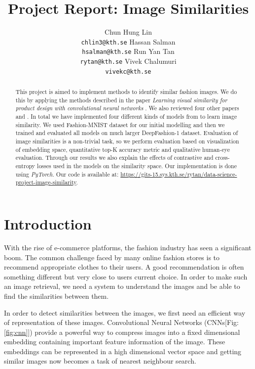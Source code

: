 \documentclass{article}
\title{Project Report: Image Similarities}
\author{
  Chun Hung Lin \\
  \texttt{chlin3@kth.se}
  \And
  Hassan Salman\\
  \texttt{hsalman@kth.se}
  \And
  Run Yan Tan \\
  \texttt{rytan@kth.se}
  \And
  Vivek Chalumuri \\
  \texttt{vivekc@kth.se}
}
\begin{document}

\maketitle

\begin{abstract}

This project is aimed to implement methods to identify similar fashion images. We do this by applying the methods described in the paper \textit{Learning visual similarity for product design with convolutional neural networks} \cite{bell2015learning}. We also reviewed four other papers \cite{wang2014learning} \cite{larsen2015autoencoding} \cite{yu2018novel} and \cite{dosovitskiy2016generating}. In total we have implemented four different kinds of models from \cite{bell2015learning} to learn image similarity. We used Fashion-MNIST \cite{xiao2017/online} dataset for our initial modelling and then we trained and evaluated all models on much larger DeepFashion-1 \cite{liuLQWTcvpr16DeepFashion} dataset. Evaluation of image similarities is a non-trivial task, so we perform evaluation based on visualization of embedding space, quantitative top-K accuracy metric and qualitative human-eye evaluation. Through our results we also explain the effects of contrastive and cross-entropy losses used in the models on the similarity space. Our implementation is done using \textit{PyTorch}. Our code is available at: \url{https://gits-15.sys.kth.se/rytan/data-science-project-image-similarity}.

\end{abstract}

\section{Introduction}

With the rise of e-commerce platforms, the fashion industry has seen a significant boom. The common challenge faced by many online fashion stores is to recommend appropriate clothes to their users. A good recommendation is often something different but very close to users current choice. In order to make such an image retrieval, we need a system to understand the images and be able to find the similarities between them. 

In order to detect similarities between the images, we first need an efficient way of representation of these images. Convolutional Neural Networks (CNNs[Fig: \ref{fig:cnn}]) provide a powerful way to compress images into a fixed dimensional embedding containing important feature information of the image. These embeddings can be represented in a high dimensional vector space and getting similar images now becomes a task of nearest neighbour search.
\end{document}
